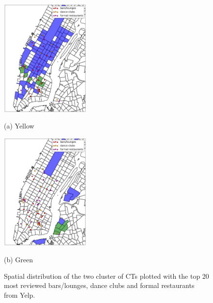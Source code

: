 \documentclass[journal]{IEEEtran}
\begin{document}
\begin{figure}[!t]
  \begin{minipage}[b]{.48\linewidth}
    \centering
    \centerline{\includegraphics[width=4.5cm]{./figs/coloring_yellow_tagged.jpg}}
    \centerline{(a) Yellow}\medskip
  \end{minipage}
  \hfill
  \begin{minipage}[b]{0.48\linewidth}
    \centering
    \centerline{\includegraphics[width=4.5cm]{./figs/coloring_green_tagged.jpg}}
    \centerline{(b) Green}\medskip
  \end{minipage}
  \caption{Spatial distribution of the two cluster of CTs plotted with the top
  20 most reviewed bars/lounges, dance clubs and formal restaurants from Yelp.}
  \label{fig:tag}
\end{figure}
\end{document}
